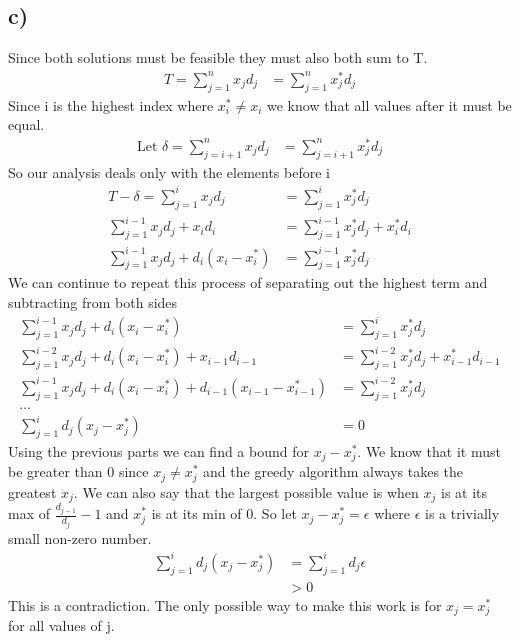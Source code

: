 \documentclass[12pt]{article}
\begin{document}
\subsection*{c)}
Since both solutions must be feasible they must also both sum to T.
\begin{align*}
    T=\sum_{j=1}^n x_j d_j &= \sum_{j=1}^n x_j^* d_j
\end{align*}
Since i is the highest index where $x^*_i \not = x_i$ we know that all values after it must be equal.
\begin{align*}
    \text{Let }\delta = \sum_{j=i+1}^n x_j d_j &= \sum_{j=i+1}^n x_j^* d_j
\end{align*}
So our analysis deals only with the elements before i
\begin{align*}
    T - \delta=\sum_{j=1}^i x_j d_j &= \sum_{j=1}^i x_j^* d_j\\
                \sum_{j=1}^{i-1} x_j d_j  + x_i d_i&= \sum_{j=1}^{i-1} x_j^* d_j + x_i^* d_i\\
                \sum_{j=1}^{i-1} x_j d_j  + d_i(x_i - x_i^*)&= \sum_{j=1}^{i-1} x_j^* d_j
\end{align*}
We can continue to repeat this process of separating out the highest term and subtracting from both sides
\begin{align*}
    \sum_{j=1}^{i-1} x_j d_j  + d_i(x_i - x_i^*) &= \sum_{j=1}^i x_j^* d_j\\
    \sum_{j=1}^{i-2} x_j d_j  + d_i(x_i - x_i^*)  + x_{i-1} d_{i-1}&= \sum_{j=1}^{i-2} x_j^* d_j + x_{i-1}^* d_{i-1}\\
    \sum_{j=1}^{i-1} x_j d_j  + d_i(x_i - x_i^*) + d_{i-1}(x_{i-1} - x_{i-1}^*)&= \sum_{j=1}^{i-2} x_j^* d_j\\
    \dots\\
    \sum_{j=1}^{i} d_j(x_j - x_j^*) &= 0
\end{align*}
Using the previous parts we can find a bound for $x_j - x_j^*$. We know that it must be greater than 0 since $x_j \not = x_j^*$ and the greedy algorithm always takes the greatest $x_j$. We can also say that the largest possible value is when $x_j$ is at its max of $\frac{d_{j-1}}{d_j} - 1$ and $x_j^*$ is at its min of 0. So let $x_j - x_j^* = \epsilon$ where $\epsilon$ is a trivially small non-zero number.
\begin{align*}
    \sum_{j=1}^{i} d_j(x_j - x_j^*) &= \sum_{j=1}^{i} d_j \epsilon\\
                                    &> 0
\end{align*}
This is a contradiction. The only possible way to make this work is for $x_j = x_j^*$ for all values of j.
\end{document}

